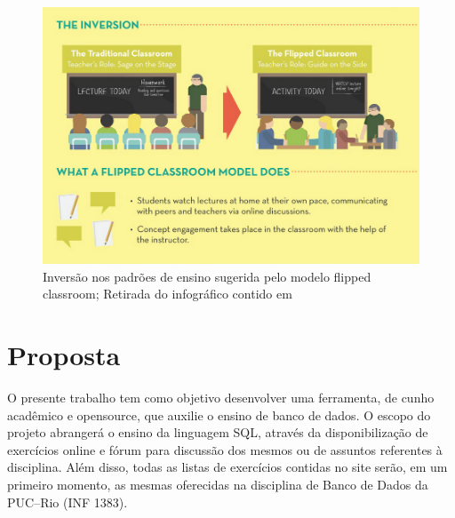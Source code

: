 \documentclass[graduacao,brazil]{ThesisPUC}
\begin{document}
\begin{figure}[H]
    \centering
    \includegraphics[width=\linewidth]{Imagens/flipped_classroom.png}
    \caption{Invers\~{a}o nos padr\~{o}es de ensino sugerida pelo modelo flipped classroom;
	     Retirada do infogr\'{a}fico contido em \cite{FlippedLearning}}
\end{figure}


\chapter{Proposta}

O presente trabalho tem como objetivo desenvolver uma ferramenta, de cunho acad\^{e}mico
e opensource, que auxilie o ensino de banco de dados. O escopo do projeto abranger\'{a} o ensino
da linguagem SQL, atrav\'{e}s da disponibiliza\c{c}\~{a}o de exerc\'{i}cios online e f\'{o}rum para discuss\~{a}o dos
mesmos ou de assuntos referentes \`{a} disciplina. Al\'{e}m disso, todas as listas de exerc\'{i}cios contidas
no site ser\~{a}o, em um primeiro momento, as mesmas oferecidas na disciplina de Banco de Dados
da PUC--Rio (INF 1383).
\end{document}
